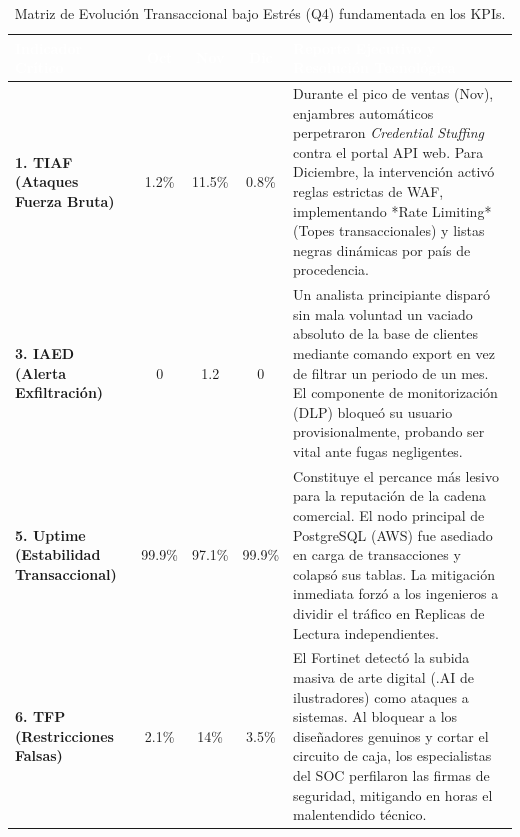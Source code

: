 \documentclass[11pt,a4paper]{article}
\begin{document}
\vspace{0.5cm}
\begin{table}[H]
\centering
\renewcommand{\arraystretch}{1.5}
\begin{tabularx}{\textwidth}{|p{3cm}|c|c|c|X|}
\hline
\rowcolor{primary}
\textcolor{white}{\textbf{Indicador Crítico}} & \textcolor{white}{\textbf{Oct}} & \textcolor{white}{\textbf{Nov}} & \textcolor{white}{\textbf{Dic}} & \textcolor{white}{\textbf{Reporte Ejecutivo y Resolución Tecnológica}} \\ \hline
\textbf{1. TIAF \newline(Ataques Fuerza Bruta)} & 1.2\% & \cellcolor{red!20}11.5\% & 0.8\% & Durante el pico de ventas (Nov), enjambres automáticos perpetraron \textit{Credential Stuffing} contra el portal API web. Para Diciembre, la intervención activó reglas estrictas de WAF, implementando *Rate Limiting* (Topes transaccionales) y listas negras dinámicas por país de procedencia. \\ \hline
\textbf{3. IAED \newline(Alerta Exfiltración)} & 0 & \cellcolor{yellow!20}1.2 & 0 & Un analista principiante disparó sin mala voluntad un vaciado absoluto de la base de clientes mediante comando export en vez de filtrar un periodo de un mes. El componente de monitorización (DLP) bloqueó su usuario provisionalmente, probando ser vital ante fugas negligentes. \\ \hline
\textbf{5. Uptime \newline(Estabilidad Transaccional)} & 99.9\% & \cellcolor{red!20}97.1\% & 99.9\% & Constituye el percance más lesivo para la reputación de la cadena comercial. El nodo principal de PostgreSQL (AWS) fue asediado en carga de transacciones y colapsó sus tablas. La mitigación inmediata forzó a los ingenieros a dividir el tráfico en Replicas de Lectura independientes. \\ \hline
\textbf{6. TFP \newline(Restricciones Falsas)} & 2.1\% & \cellcolor{yellow!20}14\% & 3.5\% & El Fortinet detectó la subida masiva de arte digital (.AI de ilustradores) como ataques a sistemas. Al bloquear a los diseñadores genuinos y cortar el circuito de caja, los especialistas del SOC perfilaron las firmas de seguridad, mitigando en horas el malentendido técnico. \\ \hline
\end{tabularx}
\caption{Matriz de Evolución Transaccional bajo Estrés (Q4) fundamentada en los KPIs.}
\end{table}
\end{document}
